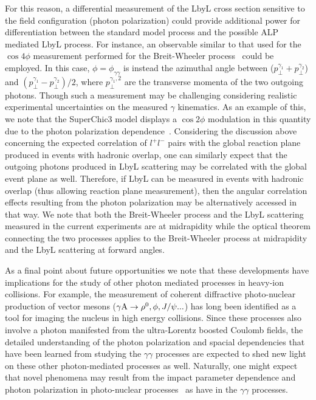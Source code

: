 \documentclass[12pt,epjc3]{svjour3}\sloppy
\begin{document}
For this reason, a differential measurement of the LbyL cross section sensitive to the field configuration (photon polarization) could provide additional power for differentiation between the standard model process and the possible ALP mediated LbyL process. For instance, an observable similar to that used for the $\cos4\phi$ measurement performed for the Breit-Wheeler process~\cite{liImpactParameterDependence2020,liProbingLinearPolarization2019,starcollaborationMeasurementMomentumAngular2021} could be employed. In this case, $\phi = \phi_{\gamma\gamma}$ is instead the azimuthal angle between ($p_\perp^{\gamma_1} + p_\perp^{\gamma_2}$) and $(p^{\gamma_1}_\perp - p^{\gamma_2}_\perp)/2$, where $p_\perp^{\gamma_1,2}$ are the transverse momenta of the two outgoing photons. Though such a measurement may be challenging considering realistic experimental uncertainties on the measured $\gamma$ kinematics. As an example of this, we note that the SuperChic3 model displays a $\cos2\phi$ modulation in this quantity due to the photon polarization dependence~\cite{SuperChic3}. Considering the discussion above concerning the expected correlation of $l^+l^-$ pairs with the global reaction plane produced in events with hadronic overlap, one can similarly expect that the outgoing photons produced in LbyL scattering may be correlated with the global event plane as well. Therefore, if LbyL can be measured in events with hadronic overlap (thus allowing reaction plane measurement), then the angular correlation effects resulting from the photon polarization may be alternatively accessed in that way. We note that both the Breit-Wheeler process and the LbyL scattering measured in the current experiments are at midrapidity while the optical theorem connecting the two processes applies to the Breit-Wheeler process at midrapidity and the LbyL scattering at forward angles. 

As a final point about future opportunities we note that these developments have implications for the study of other photon mediated processes in heavy-ion collisions. For example, the measurement of coherent diffractive photo-nuclear production of vector mesons ($\gamma {\rm A} \rightarrow \rho^0, \phi, J/\psi ...$) has long been identified as a tool for imaging the nucleus in high energy collisions. Since these processes also involve a photon manifested from the ultra-Lorentz boosted Coulomb fields, the detailed understanding of the photon polarization and spacial dependencies that have been learned from studying the $\gamma\gamma$ processes are expected to shed new light on these other photon-mediated processes as well. Naturally, one might expect that novel phenomena may result from the impact parameter dependence and photon polarization in photo-nuclear processes~\cite{zhaExploringDoubleslitInterference2021} as have in the $\gamma\gamma$ processes. 
\end{document}

